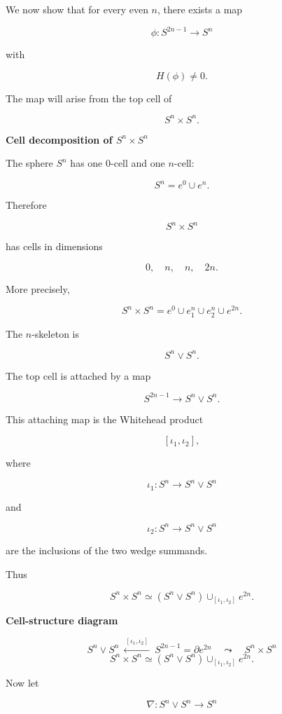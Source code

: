 \begin{solution}
We now show that for every even \(n\), there exists a map

\[
\phi:S^{2n-1}\to S^n
\]

with

\[
H(\phi)\neq 0.
\]

The map will arise from the top cell of

\[
S^n\times S^n.
\]


\medskip
\noindent\textbf{Cell decomposition of \(S^n\times S^n\)}\par
\smallskip


The sphere \(S^n\) has one \(0\)-cell and one \(n\)-cell:

\[
S^n=e^0\cup e^n.
\]

Therefore

\[
S^n\times S^n
\]

has cells in dimensions

\[
0,\quad n,\quad n,\quad 2n.
\]

More precisely,

\[
S^n\times S^n
=
e^0
\cup e^n_1
\cup e^n_2
\cup e^{2n}.
\]

The \(n\)-skeleton is

\[
S^n\vee S^n.
\]

The top cell is attached by a map

\[
S^{2n-1}\longrightarrow S^n\vee S^n.
\]

This attaching map is the Whitehead product

\[
[\iota_1,\iota_2],
\]

where

\[
\iota_1:S^n\to S^n\vee S^n
\]

and

\[
\iota_2:S^n\to S^n\vee S^n
\]

are the inclusions of the two wedge summands.

Thus

\[
S^n\times S^n
\simeq
(S^n\vee S^n)\cup_{[\iota_1,\iota_2]}e^{2n}.
\]


\medskip
\noindent\textbf{Cell-structure diagram}\par
\smallskip



\[
\boxed{
S^n\vee S^n
\ \xleftarrow{\ [\iota_1,\iota_2]\ }\ 
S^{2n-1}=\partial e^{2n}
\quad\leadsto\quad
S^n\times S^n}
\]
\[
S^n\times S^n
\simeq
(S^n\vee S^n)\cup_{[\iota_1,\iota_2]}e^{2n}.
\]



Now let

\[
\nabla:S^n\vee S^n\longrightarrow S^n
\]


\end{solution}
